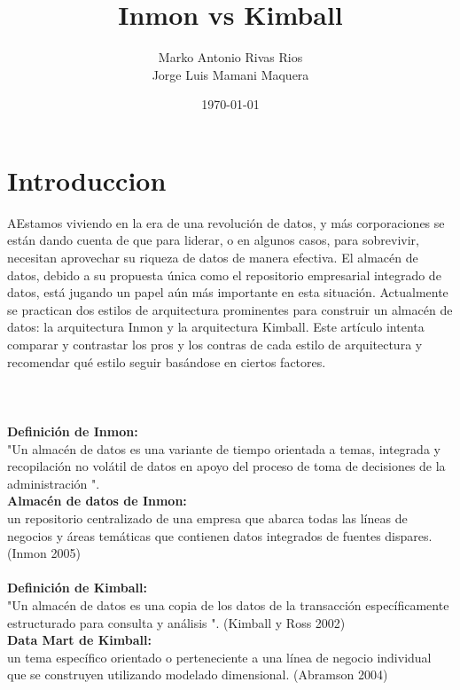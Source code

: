 \documentclass[twoside,twocolumn]{article}
\title{Inmon vs Kimball}
\author{Marko Antonio Rivas Rios\\  Jorge Luis Mamani Maquera
}
\date{\today}
\begin{document}
\maketitle


\section{Introduccion}
\lettrine[nindent=0em,lines=3]{A}Estamos viviendo en la era de una revolución de datos, y más corporaciones se están dando cuenta de que para liderar, o en algunos casos, para sobrevivir, necesitan aprovechar su riqueza de datos de manera efectiva.
El almacén de datos, debido a su propuesta única como el repositorio empresarial integrado de datos, está jugando un papel aún más importante en esta situación. Actualmente se practican dos estilos de arquitectura prominentes para construir un almacén de datos: la arquitectura Inmon y la arquitectura Kimball.
Este artículo intenta comparar y contrastar los pros y los contras de cada estilo de arquitectura y recomendar qué estilo seguir basándose en ciertos factores.\textbf{}\\
\textbf{}\\
\textbf{}\\
\textbf{}\\
\textbf{Definición de Inmon: }\\
"Un almacén de datos es una variante de tiempo orientada a temas, integrada y
recopilación no volátil de datos en apoyo del proceso de toma de decisiones de la administración ".
\textbf{}\\
\textbf{Almacén de datos de Inmon: }\\
un repositorio centralizado de una empresa que abarca todas las líneas
de negocios y áreas temáticas que contienen datos integrados de fuentes dispares.
(Inmon 2005)
\textbf{}\\
\textbf{}\\
\textbf{Definición de Kimball:}\\
 "Un almacén de datos es una copia de los datos de la transacción específicamente
estructurado para consulta y análisis ". (Kimball y Ross 2002)\textbf{}\\
\textbf{Data Mart de Kimball: }\\
un tema específico orientado o perteneciente a una línea de negocio individual
que se construyen utilizando modelado dimensional. (Abramson 2004)
\end{document}
